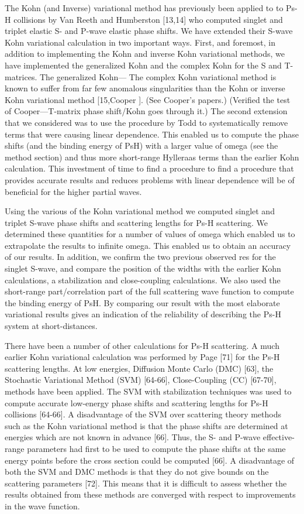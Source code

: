 \documentclass[preprint,showpacs,preprintnumbers,amsmath,amssymb]{revtex4}
\begin{document}
The Kohn (and Inverse) variational method has previously been applied to
to Ps-H collisions by 
Van Reeth and Humberston [13,14] who computed singlet and triplet elastic
S- and P-wave elastic phase shifts. 
We have extended their S-wave Kohn variational calculation in two important ways.
First, and foremost, in addition to implementing
the Kohn and inverse Kohn variational methods, we have
implemented the generalized Kohn and the complex Kohn
for the S and T-matrices. The generalized Kohn---
The complex Kohn variational method is known to suffer
from far few anomalous singularities than the
Kohn or inverse Kohn variational method [15,Cooper ]. 
(See Cooper's papers.) (Verified the test of Cooper---T-matrix
phase shift/Kohn goes through it.)
The second extension that we considered was to use
the procedure by Todd to systematically remove terms that
were causing linear dependence.
This enabled us to compute the phase shifts (and the binding
energy of PsH) with a larger value of omega (see the method section)
and thus more short-range Hylleraas terms than the earlier 
Kohn calculation. 
This investment of time to find a procedure to find
a procedure that provides accurate results
and reduces problems with linear dependence
will be of beneficial for the higher partial waves.

Using the various of the Kohn variational method we 
computed singlet and triplet S-wave 
phase shifts and scattering lengths for Ps-H scattering.
We determined these quantities for a number of values
of omega which enabled us to
extrapolate the results to infinite omega.
This enabled us to obtain an accuracy of our results.
In addition, we confirm the two previous observed res
for the singlet S-wave, and compare the
position of the widths with the earlier Kohn calculations,
a stabilization and close-coupling calculations.
We also used the short-range part/correlation part of
the full scattering wave function to compute
the binding energy of PsH.
By comparing our result with the most elaborate
variational results gives an indication of the
reliability  of describing the Ps-H system
at short-distances.

There have been a number of other calculations for
Ps-H scattering. A much earlier Kohn variational calculation was performed
by Page [71] for the Ps-H scattering lengths.
At low energies, Diffusion Monte Carlo (DMC) [63],
the Stochastic  Variational Method (SVM) [64-66],  Close-Coupling (CC) [67-70], 
 methods have been applied.
The SVM with stabilization techniques was used to compute
accurate low-energy phase shifts and scattering lengths for Ps-H collisions [64-66].
A disadvantage of the SVM over scattering theory methods
such as the Kohn variational method is that the phase shifts
are  determined at energies which  are not  known in advance [66].
Thus,  the S- and P-wave
effective-range parameters had first to be used to compute the phase shifts at the same energy
points before the cross section could be computed [66]. 
A disadvantage of both the SVM 
and DMC  methods is that they do not  give
bounds on the scattering parameters [72].
This means that it is difficult to assess whether the results
obtained from these methods are converged with respect
to improvements in the wave function.
\end{document}

